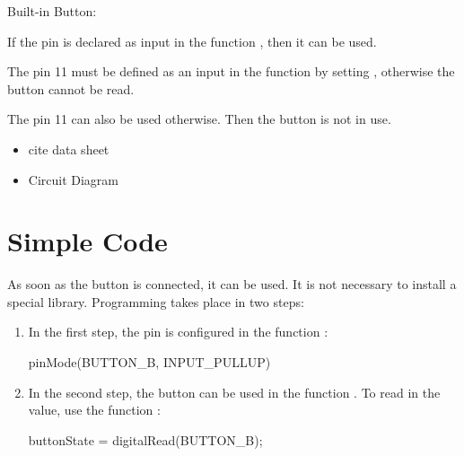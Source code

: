 \begin{description}
    \item [Built-in Button:] 
\end{description}

If the pin is declared as input in the function , then it can be used.


The pin 11 must be defined as an input in the function  by setting , otherwise the button cannot be read.

\medskip 


The pin 11 can also be used otherwise. Then the button is not in use. \cite{Arduino:2023a,Arduino:2023,ArduinoNano33Manual:2022}



\begin{itemize}
  \item cite data sheet
  \item Circuit Diagram
\end{itemize}


\section{Simple Code}


As soon as the button is connected, it can be used. It is not necessary to install a special library. Programming takes place in two steps:

\begin{enumerate}
    \item In the first step, the pin is configured in the function :
    
    {
        \begin{Arduino}
            pinMode(BUTTON_B, INPUT_PULLUP)   
        \end{Arduino}
    }
    \item In the second step, the button can be used in the function . To read in the value, use the function :
    
    {
        \begin{Arduino}
            buttonState = digitalRead(BUTTON_B);
        \end{Arduino}
    }
    
\end{enumerate}




